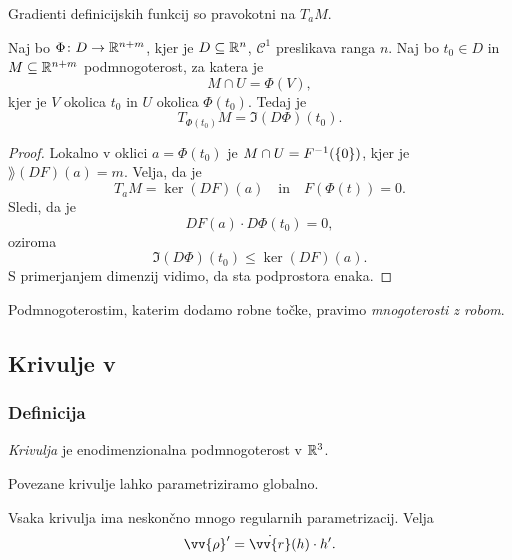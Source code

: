 \begin{opomba}
Gradienti definicijskih funkcij so pravokotni na $T_aM$.
\end{opomba}

\begin{posledica}
Naj bo $\Phi \colon D \to \mathbb{R}^{n+m}$, kjer je $D \subseteq \mathbb{R}^n$,
$\mathcal{C}^1$ preslikava ranga $n$. Naj bo $t_0 \in D$ in
$M \subseteq \mathbb{R}^{n+m}$ podmnogoterost, za katera je
\[
M \cap U = \Phi(V),
\]
kjer je $V$ okolica $t_0$ in $U$ okolica $\Phi(t_0)$. Tedaj je
\[
T_{\Phi(t_0)}M = \Im(D\Phi)(t_0).
\]
\end{posledica}

\begin{proof}
Lokalno v oklici $a = \Phi(t_0)$ je $M \cap U = F^{-1}(\left\{0\right\})$,
kjer je $\rang(DF)(a) = m$. Velja, da je
\[
T_aM = \ker(DF)(a)
\quad \text{in} \quad
F(\Phi(t)) = 0.
\]
Sledi, da je
\[
DF(a) \cdot D\Phi(t_0) = 0,
\]
oziroma
\[
\Im(D\Phi)(t_0) \leq \ker(DF)(a).
\]
S primerjanjem dimenzij vidimo, da sta podprostora enaka.
\end{proof}


\begin{opomba}
Podmnogoterostim, katerim dodamo robne točke, pravimo
\emph{mnogoterosti z robom}.
\end{opomba}

\newpage

\subsection{Krivulje v }

\subsubsection{Definicija}

\begin{definicija}
\emph{Krivulja} je enodimenzionalna podmnogoterost
v $\mathbb{R}^3$.
\end{definicija}

\begin{trditev}
Povezane krivulje lahko parametriziramo globalno.
\end{trditev}

\begin{opomba}
Vsaka krivulja ima neskončno mnogo regularnih parametrizacij. Velja
\[
\vv{\rho}' = \dot{\vv{r}}(h) \cdot h'.
\]
\end{opomba}

